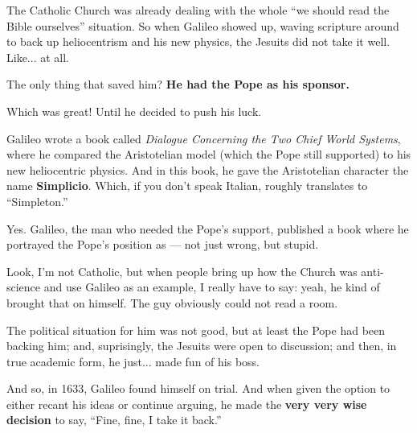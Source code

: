 \vspace{1em}


The Catholic Church was already dealing with the whole ``we should read the Bible ourselves'' situation. So when Galileo showed up, waving scripture around to back up heliocentrism and his new physics, the Jesuits did not take it well. Like... at all.

The only thing that saved him? \textbf{He had the Pope as his sponsor.} 

Which was great! Until he decided to push his luck. 

Galileo wrote a book called \textit{Dialogue Concerning the Two Chief World Systems}, where he compared the Aristotelian model (which the Pope still supported) to his new heliocentric physics. And in this book, he gave the Aristotelian character the name \textbf{Simplicio}. Which, if you don’t speak Italian, roughly translates to “Simpleton.”

Yes. Galileo, the man who needed the Pope’s support, published a book where he portrayed the Pope’s position as --- not just wrong, but stupid. 

Look, I’m not Catholic, but when people bring up how the Church was anti-science and use Galileo as an example, I really have to say: yeah, he kind of brought that on himself. The guy obviously could not read a room. 

The political situation for him was not good, but at least the Pope had been backing him; and, suprisingly, the Jesuits were open to discussion; and then, in true academic form, he just... made fun of his boss. 

And so, in 1633, Galileo found himself on trial. And when given the option to either recant his ideas or continue arguing, he made the \textbf{very very wise decision} to say, ``Fine, fine, I take it back.''


